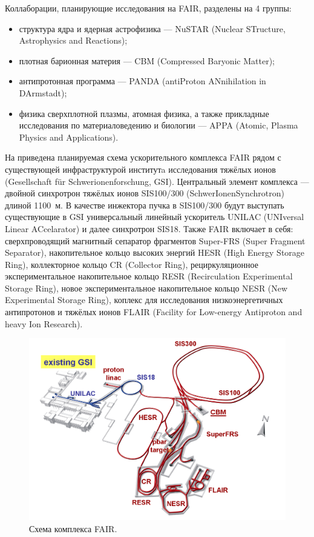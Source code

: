Коллаборации, планирующие исследования на FAIR, разделены на 4 группы:
\begin{itemize}
\item структура ядра и ядерная астрофизика --- NuSTAR (Nuclear STructure, Astrophysics and Reactions);
\item плотная барионная материя --- CBM (Compressed Baryonic Matter);
\item антипротонная программа --- PANDA (antiProton ANnihilation in DArmstadt);
\item физика сверхплотной плазмы, атомная физика, а также прикладные исследования по материаловедению и биологии --- APPA (Atomic, Plasma Physics and Applications).
\end{itemize}

На  приведена планируемая схема ускорительного комплекса FAIR рядом с существующей инфраструктурой институтa исследования тяжёлых ионов (Gesellschaft f\"{u}r Schwerionenforschung, GSI).
Центральный элемент комплекса --- двойной синхротрон тяжёлых ионов SIS100/300 (SchwerIonenSynchrotron) длиной 1100~м. В качестве инжектора пучка в SIS100/300 будут выступать существующие в GSI универсальный линейный ускоритель UNILAC (UNIversal Linear ACcelarator) и далее синхротрон SIS18.
Также FAIR включает в себя:
сверхпроводящий магнитный сепаратор фрагментов Super-FRS (Super Fragment Separator),
накопительное кольцо высоких энергий HESR (High Energy Storage Ring),
коллекторное кольцо CR (Collector Ring),
рециркуляционное экспериментальное накопительное кольцо RESR (Recirculation Experimental Storage Ring), 
новое экспериментальное накопительное кольцо NESR (New Experimental Storage Ring),
коплекс для исследования низкоэнергетичных антипротонов и тяжёлых ионов FLAIR (Facility for Low-energy Antiproton and heavy Ion Research).

\begin{figure}[H]
\includegraphics[width=1.0\textwidth]{pictures/FAIR_structure.png}
\caption{Схема комплекса FAIR.}
\label{fig:FAIRstructure}
\end{figure}

